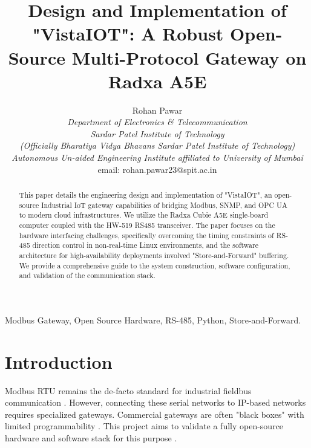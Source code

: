 \documentclass[journal]{IEEEtran}
\begin{document}
\title{Design and Implementation of "VistaIOT": A Robust Open-Source Multi-Protocol Gateway on Radxa A5E}

\author{Rohan Pawar \\
\textit{Department of Electronics \& Telecommunication} \\
\textit{Sardar Patel Institute of Technology} \\
\textit{(Officially Bharatiya Vidya Bhavans Sardar Patel Institute of Technology)} \\
\textit{Autonomous Un-aided Engineering Institute affiliated to University of Mumbai} \\
email: rohan.pawar23@spit.ac.in}

\maketitle

\begin{abstract}
This paper details the engineering design and implementation of "VistaIOT", an open-source Industrial IoT gateway capabilities of bridging Modbus, SNMP, and OPC UA to modern cloud infrastructures. We utilize the Radxa Cubie A5E single-board computer coupled with the HW-519 RS485 transceiver. The paper focuses on the hardware interfacing challenges, specifically overcoming the timing constraints of RS-485 direction control in non-real-time Linux environments, and the software architecture for high-availability deployments involved "Store-and-Forward" buffering. We provide a comprehensive guide to the system construction, software configuration, and validation of the communication stack.
\end{abstract}

\begin{IEEEkeywords}
Modbus Gateway, Open Source Hardware, RS-485, Python, Store-and-Forward.
\end{IEEEkeywords}

\section{Introduction}
Modbus RTU remains the de-facto standard for industrial fieldbus communication \cite{modbus_org}. However, connecting these serial networks to IP-based networks requires specialized gateways. Commercial gateways are often "black boxes" with limited programmability \cite{iiot_gateway_challenges}. This project aims to validate a fully open-source hardware and software stack for this purpose \cite{open_hardware_industry}.
\end{document}
